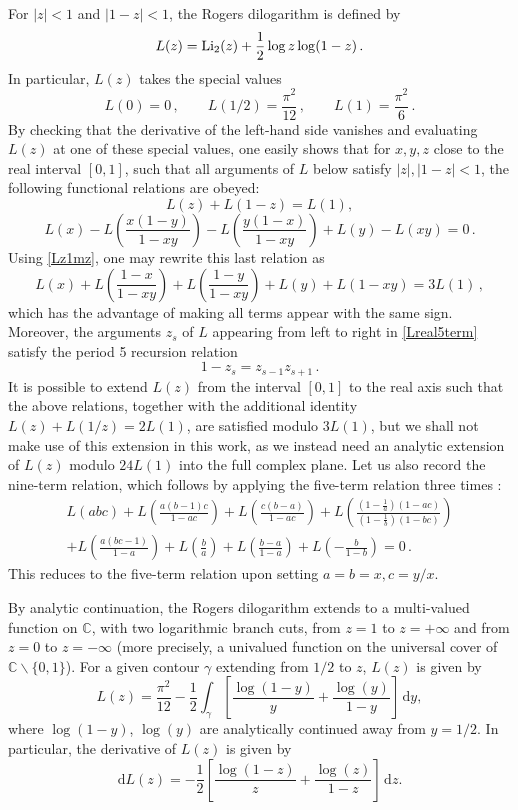 \documentclass[12pt,reqno]{article}
\numberwithin{equation}{section}
\newcommand{\be}{\begin{equation}}
\newcommand{\ee}{\end{equation}}
\newcommand{\de}{\mathrm{d}}
\newcommand{\IC}{\mathbb{C}}
\def\ind{s}
\numberwithin{equation}{section}
\begin{document}
For $|z|<1$ and $|1-z|<1$, the Rogers dilogarithm is defined by
\be
L(z) = {\rm Li}_2(z)+\frac12 \log z \log(1-z)\, .
\ee
In particular, $L(z)$ takes the special values
\be
L(0)=0\, ,
\qquad
L(1/2) = \frac{\pi^2}{12}\, ,
\qquad
L(1)=\frac{\pi^2}{6}\, .
\ee
By checking that the derivative of the left-hand side vanishes and evaluating $L(z)$
at one of these special values, one easily shows that for $x,y,z$ close to
the real interval $[0,1]$, such that all arguments of $L$ below satisfy $|z|,|1-z|<1$,
the following functional relations are obeyed:
\be
\label{Lz1mz}
L(z)+L(1-z)=L(1),
\ee
\be
\label{Lreal5term2}
L(x) -L\left(\frac{x(1-y)}{1-xy}\right)- L\left(\frac{y(1-x)}{1-xy}\right) + L(y) - L(xy)=0\, .
\ee
Using \eqref{Lz1mz}, one may rewrite this last relation as
\be
\label{Lreal5term}
L(x) +L\left(\frac{1-x}{1-xy}\right)+ L\left(\frac{1-y}{1-xy}\right) + L(y) + L(1-xy)=3L(1)\, ,
\ee
which has the advantage of making all terms appear with the same sign. Moreover,
the arguments $z_\ind$ of $L$ appearing from left to right  in \eqref{Lreal5term}
satisfy the period 5 recursion relation
\be
\label{recurz}
1-z_\ind=z_{\ind-1} z_{\ind+1}\, .
\ee
It is possible to extend $L(z)$ from the interval $[0,1]$ to the real axis such that the above
relations, together with the additional identity  $L(z)+L(1/z)=2L(1)$, are satisfied modulo
$3L(1)$, but we shall not make use of this extension in this work, as we instead
need an analytic extension of $L(z)$ modulo $24L(1)$ into the full complex plane.
Let us also record the nine-term relation, which follows by applying the five-term
relation three times \cite{Kirillov_1994}:
\be
\label{nineterm}
\begin{split}
L(a b c)+L\left(\frac{a (b-1) c}{1-a c}\right)+L\left(\frac{c (b-a)}{1-a
   c}\right)+L\left(\frac{\left(1-\frac{1}{a}\right) (1-a
   c)}{\left(1-\frac{1}{b}\right) (1-b c)}\right)
   \\
   +L\left(\frac{a (b
   c-1)}{1-a}\right)+L\left(\frac{b}{a}\right)+L\left(\frac{b-a}{1-a}\right)
   +L\left(-\frac{b}{1-b}\right) = 0\, .
\end{split}
\ee
This reduces to the five-term relation upon setting $a=b=x, c=y/x$.

By analytic continuation, the Rogers dilogarithm extends to a multi-valued function on $\IC$,
with two logarithmic branch cuts,  from $z=1$ to $z=+\infty$ and from
$z=0$ to $z=-\infty$ (more precisely,
a univalued function on the universal cover of $\IC\backslash\{0,1\}$).
For a given contour $\gamma$ extending from $1/2$ to $z$,
$L(z)$ is given by
\be
L(z) = \frac{\pi^2}{12} -\frac12 \int_{\gamma} \left[ \frac{\log(1-y)}{y} + \frac{\log(y)}{1-y} \right] \, \de y,
\ee
where $\log(1-y)$, $\log(y)$ are analytically continued away from $y=1/2$.
In particular, the derivative of $L(z)$ is given by
\be
\de  L(z) = - \frac12 \left[ \frac{\log(1-z)}{z} + \frac{\log(z)}{1-z} \right]\, \de z.
\ee
\end{document}
